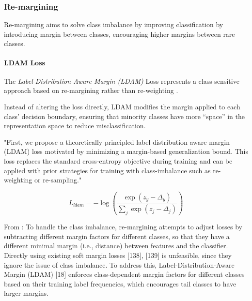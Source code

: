 \subsubsection{Re-margining}
Re-margining aims to solve class imbalance by improving classification by introducing margin between classes, encouraging higher margins between rare classes.

\paragraph{LDAM Loss}
The \emph{Label-Distribution-Aware Margin (LDAM)} Loss represents a class-sensitive approach based on re-margining rather than re-weighting \cite{cao2019learningimbalanceddatasetslabeldistributionaware}. 

Instead of altering the loss directly, LDAM modifies the margin applied to each class’ decision boundary, ensuring that minority classes have more “space” in the representation space to reduce misclassification.

"First, we propose a theoretically-principled label-distribution-aware margin (LDAM) loss motivated by minimizing a margin-based generalization bound. This loss replaces the standard cross-entropy objective during training and can be applied with prior strategies for training with class-imbalance such as re-weighting or re-sampling." 

\begin{equation}
    L_{ldam} = - \log\left( \frac{\exp(z_y - \Delta_y)}{\sum_j \exp(z_j - \Delta_j)} \right)
\end{equation}

From \cite{zhang2023deep}: To handle the class imbalance, re-margining
attempts to adjust losses by subtracting different margin factors for
different classes, so that they have a different minimal margin (i.e.,
distance) between features and the classifier. Directly using existing
soft margin losses [138], [139] is unfeasible, since they ignore the
issue of class imbalance. To address this, Label-Distribution-Aware
Margin (LDAM) [18] enforces class-dependent margin factors for
different classes based on their training label frequencies, which
encourages tail classes to have larger margins.

